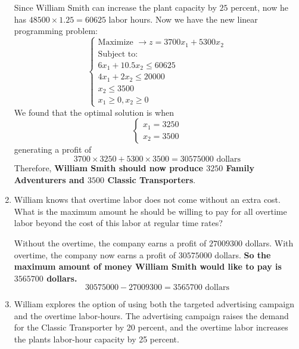 \documentclass[
]{article}
\begin{document}
\begin{enumerate}
  Since William Smith can increase the plant capacity by \(25\) percent,
  now he has \(48500 \times 1.25 = 60625\) labor hours. Now we have the
  new linear programming problem: \[
  \begin{cases}
           \text{Maximize  } \rightarrow z = 3700x_1 + 5300x_2\\
           \text{Subject to:}\\
           6x_1 +10.5x_2 \leq 60625\\
           4x_1 + 2x_2 \leq 20000\\
           x_2 \leq 3500\\
           x_1 \geq 0, x_2 \geq 0
   \end{cases}
  \] We found that the optimal solution is when \[
  \begin{cases}
           x_1 = 3250\\ 
           x_2 = 3500
   \end{cases}
  \] generating a profit of \[
  3700 \times 3250 + 5300 \times 3500 = 30575000 \text{   dollars}
  \] Therefore, \textbf{William Smith should now produce \(3250\) Family
  Adventurers and \(3500\) Classic Transporters}.
\item
  William knows that overtime labor does not come without an extra cost.
  What is the maximum amount he should be willing to pay for all
  overtime labor beyond the cost of this labor at regular time rates?

  Without the overtime, the company earns a profit of \(27009300\)
  dollars. With overtime, the company now earns a profit of \(30575000\)
  dollars. \textbf{So the maximum amount of money William Smith would
  like to pay is \(3565700\) dollars.} \[
  30575000 - 27009300 = 3565700 \text{ dollars}
  \]
\item
  William explores the option of using both the targeted advertising
  campaign and the overtime labor-hours. The advertising campaign raises
  the demand for the Classic Transporter by 20 percent, and the overtime
  labor increases the plants labor-hour capacity by 25 percent.
\end{enumerate}
\end{document}
